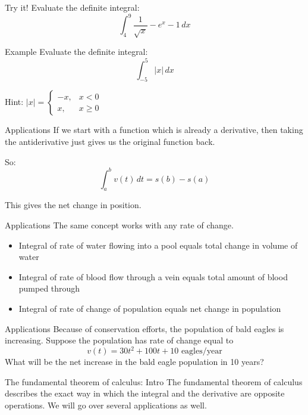 \documentclass[t]{beamer}
\begin{document}
\begin{frame}{Try it!}
Evaluate the definite integral:
$$\int_4^9 \frac{1}{\sqrt{x}} - e^x - 1 \, dx $$
\end{frame}

\begin{frame}{Example}
Evaluate the definite integral:
$$\int_{-5}^5 |x| \, dx$$

Hint: $\displaystyle |x| = \begin{cases}
-x, & x < 0 \\
x, & x \ge 0
\end{cases}
$
\end{frame}

\begin{frame}{Applications}
If we start with a function which is already a derivative, then taking
the antiderivative just gives us the original function back.

So: 
$$\int_a^b v(t) \, dt = s(b) - s(a) $$

This gives the net change in position.
\end{frame}

\begin{frame}{Applications}
The same concept works with any rate of change.
\begin{itemize}
\item Integral of rate of water flowing into a pool equals total change in
volume of water
\item Integral of rate of blood flow through a vein equals total amount of blood
pumped through
\item Integral of rate of change of population equals net change in population
\end{itemize}
\end{frame}

\begin{frame}{Applications}
Because of conservation efforts, the population of bald eagles is increasing.  Suppose the population has rate of change equal to 
$$v(t) = 30t^2 + 100t + 10 \text{ eagles/year}$$
What will be the net increase in the bald eagle population in 10 years?
\end{frame}

\begin{frame}{The fundamental theorem of calculus: Intro}
The fundamental theorem of calculus describes the exact way
in which the integral and the derivative are opposite operations. 
We will go over several applications as well.
\end{frame}
\end{document}
